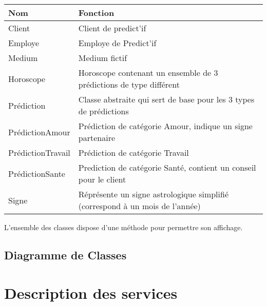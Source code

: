 \documentclass[a4paper,10pt,french]{sphinxmanual}
\begin{document}
\begin{tabulary}{\linewidth}{|L|L|}
\hline
\textsf{\relax 
Nom
} & \textsf{\relax 
Fonction
}\\
\hline
Client
 & 
Client de predict'if
\\
\hline
Employe
 & 
Employe de Predict'if
\\
\hline
Medium
 & 
Medium fictif
\\
\hline
Horoscope
 & 
Horoscope contenant un ensemble de 3 prédictions de type différent
\\
\hline
Prédiction
 & 
Classe abstraite qui sert de base pour les 3 types de prédictions
\\
\hline
PrédictionAmour
 & 
Prédiction de catégorie Amour,
indique un signe partenaire
\\
\hline
PrédictionTravail
 & 
Prédiction de catégorie Travail
\\
\hline
PrédictionSante
 & 
Prediction de catégorie Santé, contient un conseil pour le client
\\
\hline
Signe
 & 
Réprésente un signe astrologique simplifié
(correspond à un mois de l'année)
\\
\hline\end{tabulary}


L'ensemble des classes dispose d'une méthode  pour permettre son affichage.


\section{Diagramme de Classes}
\label{modele:diagramme-de-classes}

\chapter{Description des services}
\label{services::doc}\label{services:description-des-services}
\end{document}
